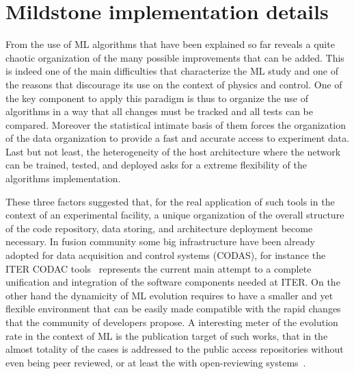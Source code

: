 \chapter{Mildstone implementation details}
\label{section:5_mildstone}

From the use of ML algorithms that have been explained so far reveals a quite chaotic organization of the many possible improvements that can be added. This is indeed one of the main difficulties that characterize the ML study and one of the reasons that discourage its use on the context of physics and control.
One of the key component to apply this paradigm is thus to organize the use of algorithms in a way that all changes must be tracked and all tests can be compared.
Moreover the statistical intimate basis of them forces the organization of the data organization to provide a fast and accurate access to experiment data. 
Last but not least, the heterogeneity of the host architecture where the network can be trained, tested, and deployed asks for a extreme flexibility of the algorithms implementation.

These three factors suggested that, for the real application of such tools in the context of an experimental facility, a unique organization of the overall structure of the code repository, data storing, and architecture deployment become necessary.
In fusion community some big infrastructure have been already adopted for data acquisition and control systems (CODAS), for instance the ITER CODAC tools~\cite{iter_CODAC} represents the current main attempt to a complete unification and integration of the software components needed at ITER.
On the other hand the dynamicity of ML evolution requires to have a smaller and yet flexible environment that can be easily made compatible with the rapid changes that the community of developers propose.
A interesting meter of the evolution rate in the context of ML is the publication target of such works, that in the almost totality of the cases is addressed to the public access repositories without even being peer reviewed, or at least the with open-reviewing systems~\cite{open_review}. 


